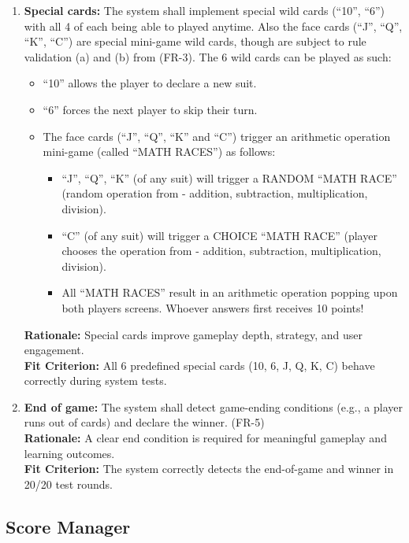 \documentclass[12pt]{article}
\begin{document}
\begin{enumerate}
    \item \textbf{Special cards:} The system shall implement special wild cards (``10'', ``6'') with all 4 of each being able to played anytime. 
    Also the face cards (``J'', ``Q'', ``K'', ``C'') are special mini-game wild cards, though are subject to rule validation (a) and (b) from (FR-3).
    The 6 wild cards can be played as such: \\
    \begin{itemize}
      \item ``10'' allows the player to declare a new suit.
      \item ``6'' forces the next player to skip their turn.
      \item The face cards (``J'', ``Q'', ``K'' and ``C'') trigger an arithmetic operation mini-game (called ``MATH RACES'') as follows:
        \begin{itemize}
          \item ``J'', ``Q'', ``K'' (of any suit) will trigger a RANDOM ``MATH RACE'' (random operation from - addition, subtraction, multiplication, division).
          \item ``C'' (of any suit) will trigger a CHOICE ``MATH RACE'' (player chooses the operation from - addition, subtraction, multiplication, division).
          \item All ``MATH RACES'' result in an arithmetic operation popping upon both players screens. Whoever answers first receives 10 points!
        \end{itemize}
    \end{itemize}
    \textbf{Rationale:} Special cards improve gameplay depth, strategy, and user engagement. \\
    \textbf{Fit Criterion:} All 6 predefined special cards (10, 6, J, Q, K, C) behave correctly during system tests.

    \item \textbf{End of game:} The system shall detect game-ending conditions (e.g., a player runs out of cards) and declare the winner. (FR-5) \\
    \textbf{Rationale:} A clear end condition is required for meaningful gameplay and learning outcomes. \\
    \textbf{Fit Criterion:} The system correctly detects the end-of-game and winner in 20/20 test rounds.
\end{enumerate}

\subsection{Score Manager}
\end{document}
